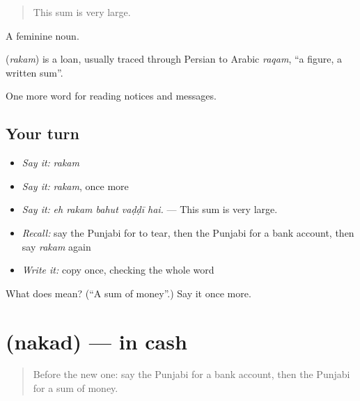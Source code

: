 \begin{quote}
This sum is very large.
\end{quote}

A feminine noun.

\begin{cousinweb}
\textbf{} (\emph{rakam}) is a loan, usually traced through Persian to Arabic \emph{raqam}, \textquotedblleft{}a figure, a written sum\textquotedblright{}.
\end{cousinweb}

\begin{grammarlens}[title={What you've built}]
One more word for reading notices and messages.
\end{grammarlens}

\subsection*{Your turn}
\begin{itemize}
\raggedright
  \item \emph{Say it:} \emph{rakam}
  \item \emph{Say it:} \emph{rakam}, once more
  \item \emph{Say it:} \emph{eh rakam bahut vaḍḍī hai.} — This sum is very large.
  \item \emph{Recall:} say the Punjabi for to tear, then the Punjabi for a bank account, then say \emph{rakam} again
  \item \emph{Write it:} copy \textbf{} once, checking the whole word
\end{itemize}

\begin{tcolorbox}[breakable,colback=teal!4,colframe=teal!35!black,title={Before you move on}]
What does  mean? (\textquotedblleft{}A sum of money\textquotedblright{}.) Say it once more.
\end{tcolorbox}
\section[\texorpdfstring{\pa{ਨਕਦ} (nakad)}{ਨਕਦ (nakad)}]{ (nakad) — in cash}

\label{lesson:PA-C257-nakad}



\begin{quote}
Before the new one: say the Punjabi for a bank account, then the Punjabi for a sum of money.
\end{quote}

